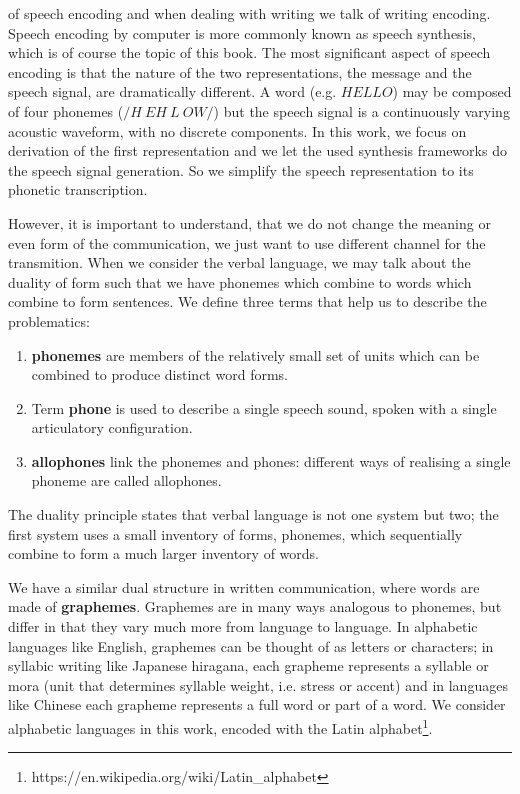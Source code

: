 of speech encoding and when dealing with writing we talk of writing encoding. Speech encoding
by computer is more commonly known as speech synthesis, which is of course the topic of this
book.
The most significant aspect of speech encoding is that the nature of the two representations,
the message and the speech signal, are dramatically different.
A word (e.g. $HELLO$) may be composed of four phonemes ($/H\:EH\:L\:OW/$) but the speech signal is a continuously varying acoustic waveform, with no discrete components.
In this work, we focus on derivation of the first representation and we let the used synthesis frameworks do the speech signal generation.
So we simplify the speech representation to its phonetic transcription.
\par
However, it is important to understand, that we do not change the meaning or even form of the communication, we just want to use different channel for the transmition.
When we consider the verbal language, we may talk about the duality of form such that we have phonemes which combine to words which combine to form sentences.
We define three terms that help us to describe the problematics:
\begin{enumerate}
\item \textbf{phonemes} are members of the relatively small set of units which can be combined to produce distinct word forms.
\item Term \textbf{phone} is used to describe a single speech sound, spoken with a single articulatory configuration.
\item \textbf{allophones} link the phonemes and phones: different ways of realising a single phoneme are called allophones.
\end{enumerate}
The duality principle states that verbal language is not one system but two; the first system uses a
small inventory of forms, phonemes, which sequentially combine to form a much larger inventory
of words.
\par
We have a similar dual structure in written communication, where words are made of \textbf{graphemes}.
Graphemes are in many ways analogous to phonemes, but differ in that they vary much more from language to language.
In alphabetic languages like English, graphemes can be thought of as letters or characters; in syllabic writing like Japanese hiragana, each grapheme represents a syllable or mora (unit that determines syllable weight, i.e. stress or accent) and in languages like Chinese each grapheme represents a full word or part of a word.
We consider alphabetic languages in this work, encoded with the Latin alphabet\footnote{https://en.wikipedia.org/wiki/Latin\_alphabet}.
